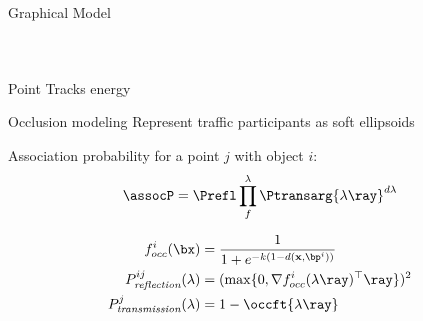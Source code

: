 
\begin{frame}{Graphical Model}
  \vspace*{-.5cm}
  \begin{columns}
    \begin{column}[t]{0.4\textwidth}
      \tikzset{/tikz/x=0.6cm,/tikz/y=0.6cm}
      \scriptsize{
        
      }
    \end{column}
    \hspace{10pt}
     {
      \vrule{}
    }
    \begin{column}[t]{0.6\textwidth}
    \end{column}
  \end{columns}
  \vspace*{-0.5cm}
  \begin{center}
  \end{center}
  \vspace*{-.5cm}
\end{frame}

\begin{frame}{Point Tracks energy}
  \centering
  \begin{figure}
  
  \end{figure}
\end{frame}

% 
\begin{frame}{Occlusion modeling}
  Represent traffic participants as soft ellipsoids
  \centering
  
  Association probability for a point $j$ with object $i$: 
  \[\assocP = \Prefl\prod_{f}^{\lambda}\Ptransarg{\lambda \ray}^{d\lambda}\]
\end{frame}

\begin{frame}
  \centering
  
    \begin{align}
      f^i_{occ}(\bx) &= \frac{1}{1 + e^{-k(1 - d(\mathbf{x},\bp^{i}))}} \\
      P^{ij}_{\textit{reflection}} (\lambda) &= (\max \{0, \nabla {f^i_{occ}}(\lambda \ray)^\top \ray \})^2 \\
      P^j_{\textit{transmission}}(\lambda) &= 1 - \occft{\lambda \ray}
    \end{align}
\end{frame}

